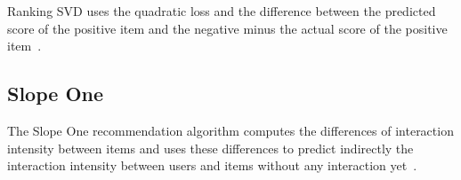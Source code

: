 Ranking SVD uses the quadratic loss and the difference between the
predicted score of the positive item and the negative minus the actual
score of the positive item~\cite{jahrer2011collaborative}.

\subsection{Slope One}

The Slope One recommendation algorithm computes the differences of
interaction intensity between items and uses these differences to 
predict indirectly the interaction intensity between users and items
without any interaction yet~\cite{DBLP:journals/corr/abs-cs-0702144}.
